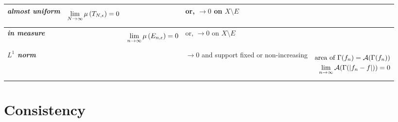\documentclass[11pt]{article}
\begin{document}
\begin{table}[h!]
\begin{tabularx}{1\textwidth} { 
  | >{\raggedright\arraybackslash} m{2cm}
  | >{\centering\arraybackslash}X
  | >{\centering\arraybackslash}X
  | >{\centering\arraybackslash}X
  | >{\centering\arraybackslash}X  | }
\hline
 \emph{\textbf{almost uniform}} & 
  \begin{align*}
 \lim\limits_{N \rightarrow \infty}\mu\left(T_{N,\epsilon}\right) = 0
\end{align*} 
 & & or, $\rightarrow 0$ on $X \setminus E$  &\\
 \hline
 \emph{\textbf{in measure}} & &
  \begin{align*}
 \lim\limits_{n \rightarrow \infty}\mu\left(E_{n,\epsilon}\right) = 0
\end{align*}  
  & or, $\rightarrow 0$ on $X \setminus E$ &\\
  \hline
\emph{\textbf{$L^{1}$ norm}} & & &
$\rightarrow 0$ and support fixed or non-increasing
 & 
  \begin{align*}
  \text{area of }\Gamma(f_n) = {\mathcal A}(\Gamma(f_n))\\
  \lim\limits_{n \rightarrow \infty}{\mathcal A}(\Gamma(\left\lvert f_n- f \right\rvert)) = 0
\end{align*} \\
\hline
\end{tabularx}
\end{table}

\newpage
\section{Consistency}
\end{document}
